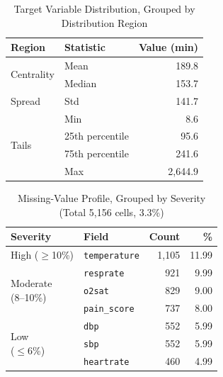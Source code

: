 \documentclass[conference]{IEEEtran}
\begin{document}
\begin{table}[H]
\centering
\caption{Target Variable Distribution, Grouped by Distribution Region}
\label{tab:target}
\renewcommand{\arraystretch}{1.15}
\begin{tabular}{p{2.0cm}lr}
\toprule
\textbf{Region} & \textbf{Statistic} & \textbf{Value (min)} \\
\midrule
\multirow{2}{*}{Centrality} & Mean   & 189.8 \\
                            & Median &  153.7 \\
\midrule
Spread                      & Std    & 141.7 \\
\midrule
\multirow{4}{*}{Tails}      & Min               &     8.6 \\
                            & 25th percentile   &    95.6 \\
                            & 75th percentile   &   241.6 \\
                            & Max               & 2{,}644.9 \\
\bottomrule
\end{tabular}
\end{table}

\begin{table}[H]
\centering
\caption{Missing-Value Profile, Grouped by Severity (Total 5{,}156 cells, 3.3\%)}
\label{tab:missing}
\renewcommand{\arraystretch}{1.15}
\begin{tabular}{p{2.2cm}lrr}
\toprule
\textbf{Severity} & \textbf{Field} & \textbf{Count} & \textbf{\%} \\
\midrule
High ($\geq$10\%)
 & \texttt{temperature} & 1{,}105 & 11.99 \\
\midrule
\multirow{3}{*}{\parbox{2.2cm}{Moderate\\(8--10\%)}}
 & \texttt{resprate}    &  921 & 9.99 \\
 & \texttt{o2sat}       &  829 & 9.00 \\
 & \texttt{pain\_score} &  737 & 8.00 \\
\midrule
\multirow{3}{*}{\parbox{2.2cm}{Low\\($\leq$6\%)}}
 & \texttt{dbp}        & 552 & 5.99 \\
 & \texttt{sbp}        & 552 & 5.99 \\
 & \texttt{heartrate}  & 460 & 4.99 \\
\bottomrule
\end{tabular}
\end{table}
\end{document}
